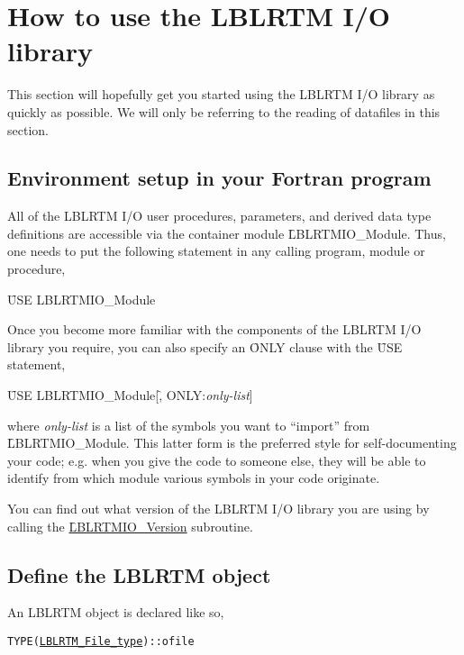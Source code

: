 \chapter{How to use the LBLRTM I/O library}
\label{chapter:use}

This section will hopefully get you started using the LBLRTM I/O library as quickly as possible. We will only be referring to the reading of datafiles in this section.


\section{Environment setup in your Fortran program}

All of the LBLRTM I/O user procedures, parameters, and derived data type definitions are accessible via the container module \f{LBLRTMIO\_Module}. Thus, one needs to put the following statement in any calling program, module or procedure,

\hspace{0.4cm}\f{USE LBLRTMIO\_Module}

Once you become more familiar with the components of the LBLRTM I/O library you require, you can also specify an \f{ONLY} clause with the \f{USE} statement,

\hspace{0.4cm}\f{USE LBLRTMIO\_Module}[\f{, ONLY:}\textit{only-list}]

where \textit{only-list} is a list of the symbols you want to ``import'' from \f{LBLRTMIO\_Module}. This latter form is the preferred style for self-documenting your code; e.g. when you give the code to someone else, they will be able to identify from which module various symbols in your code originate.

You can find out what version of the LBLRTM I/O library you are using by calling the \hyperref[sec:LBLRTMIO_Version_interface]{\f{LBLRTMIO\_Version}} subroutine.



\section{Define the LBLRTM \File{} object}

An LBLRTM \File{} object is declared like so,
\begin{alltt}
  TYPE(\hyperref[fig:LBLRTM_File_type_structure]{LBLRTM_File_type}) :: ofile\end{alltt}

